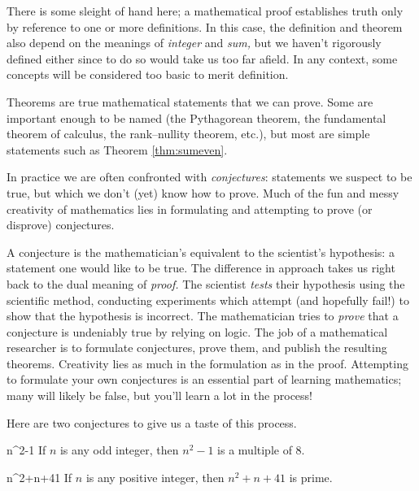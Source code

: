 There is some sleight of hand here; a mathematical proof establishes truth only by reference to one or more definitions. In this case, the definition and theorem also depend on the meanings of \emph{integer} and \emph{sum,} but we haven't rigorously defined either since to do so would take us too far afield. In any context, some concepts will be considered too basic to merit definition.


\goodbreak



Theorems are true mathematical statements that we can prove. Some are important enough to be named (the Pythagorean theorem, the fundamental theorem of calculus, the rank--nullity theorem, etc.), but most are simple statements such as Theorem \ref{thm:sumeven}.\smallbreak

In practice we are often confronted with \emph{conjectures}: statements we suspect to be true, but which we don't (yet) know how to prove. Much of the fun and messy creativity of mathematics lies in formulating and attempting to prove (or disprove) conjectures.\smallbreak

A conjecture is the mathematician's equivalent to the scientist's hypothesis: a statement one would like to be true. The difference in approach takes us right back to the dual meaning of \emph{proof.} The scientist \emph{tests} their hypothesis using the scientific method, conducting experiments which attempt (and hopefully fail!) to show that the hypothesis is incorrect. The mathematician tries to \emph{prove} that a conjecture is undeniably true by relying on logic. The job of a mathematical researcher is to formulate conjectures, prove them, and publish the resulting theorems. Creativity lies as much in the formulation as in the proof. Attempting to formulate your own conjectures is an essential part of learning mathematics; many will likely be false, but you'll learn a lot in the process!\medbreak

Here are two conjectures to give us a taste of this process.

\begin{conj}{}{n^2-1}
	If $n$ is any odd integer, then $n^2-1$ is a multiple of 8.
\end{conj}

\begin{conj}{}{n^2+n+41}
	If $n$ is any positive integer, then $n^2+n+41$ is prime.\footnotemark
\end{conj}


